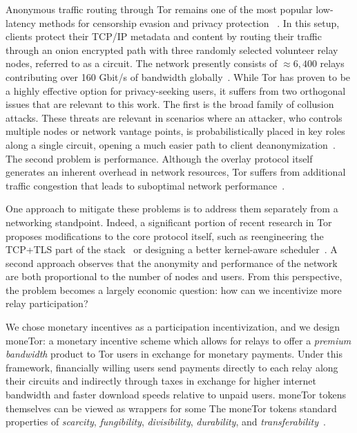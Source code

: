 Anonymous traffic routing through Tor remains one of the most popular
low-latency methods for censorship evasion and privacy protection
~\cite{dingledine2004tor}. In this setup, clients protect their TCP/IP metadata
and content by routing their traffic through an onion encrypted path with three
randomly selected volunteer relay nodes, referred to as a circuit. The network
presently consists of $\approx 6,400$ relays contributing over 160 Gbit/s of
bandwidth globally~\cite{portal2018tormetrics}. While Tor has proven to be a
highly effective option for privacy-seeking users, it suffers from two
orthogonal issues that are relevant to this work. The first is the broad family
of collusion attacks. These threats are relevant in scenarios where an attacker,
who controls multiple nodes or network vantage points, is probabilistically
placed in key roles along a single circuit, opening a much easier path to client
deanonymization~\cite{wright2004predecessor,murdoch2005low}. The second problem
is performance. Although the overlay protocol itself generates an inherent
overhead in network resources, Tor suffers from additional traffic congestion
that leads to suboptimal network performance~\cite{portal2018tormetrics,
  alsabah2016performance}.

One approach to mitigate these problems is to address them separately from a
networking standpoint. Indeed, a significant portion of recent research in Tor
proposes modifications to the core protocol itself, such as reengineering the
TCP+TLS part of the stack~\cite{reardon2009improving} or designing a better
kernel-aware scheduler~\cite{jansen2014never}. A second approach observes that
the anonymity and performance of the network are both proportional to the number
of nodes and users. From this perspective, the problem becomes a largely
economic question: how can we incentivize more relay participation?

We chose monetary incentives as a participation incentivization, and we design
moneTor: a monetary incentive scheme which allows for relays to offer a
\emph{premium bandwidth} product to Tor users in exchange for monetary payments.
Under this framework, financially willing users send payments directly to each
relay along their circuits and indirectly through taxes in exchange for higher
internet bandwidth and faster download speeds relative to unpaid users. %
moneTor tokens themselves can be viewed as wrappers for some
The moneTor tokens %
standard properties of \textit{scarcity}, \textit{fungibility},
\textit{divisibility}, \textit{durability}, and
\textit{transferability}~\cite[p.3]{crump2011phenomenon}.

